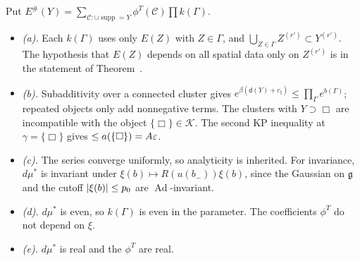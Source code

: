 \begin{detail}
\begin{step}
Put $E^\#(Y)=\sum_{\mathcal C:\cup\operatorname{supp}=Y}\phi^T(\mathcal C)\prod k(\Gamma)$.
\begin{itemize}
\item \emph{(a).} Each $k(\Gamma)$ uses only $E(Z)$ with $Z\in\Gamma$, and $\bigcup_{Z\in\Gamma}Z^{(r')}\subset Y^{(r')}$. The hypothesis that $E(Z)$ depends on all spatial data only on $Z^{(r')}$ is in the statement of Theorem~.
\item \emph{(b).} Subadditivity over a connected cluster gives $e^{\beta(\mathsf d(Y)+c_\natural)}\le\prod_\Gamma e^{b(\Gamma)}$; repeated objects only add nonnegative terms. The clusters with $Y\supset\Box$ are incompatible with the object $\{\Box\}\in\mathcal K$. The second KP inequality at $\gamma=\{\Box\}$ gives $\le a(\{\Box\})=A\varepsilon$.
\item \emph{(c).} The series converge uniformly, so analyticity is inherited. For invariance, $d\mu^*$ is invariant under $\xi(b)\mapsto R(u(b_-))\xi(b)$, since the Gaussian on $\mathfrak g$ and the cutoff $\lvert\xi(b)\rvert\le p_0$ are $\operatorname{Ad}$-invariant.
\item \emph{(d).} $d\mu^*$ is even, so $k(\Gamma)$ is even in the parameter. The coefficients $\phi^T$ do not depend on $\xi$.
\item \emph{(e).} $d\mu^*$ is real and the $\phi^T$ are real.
\end{itemize}
\end{step}
\end{detail}

